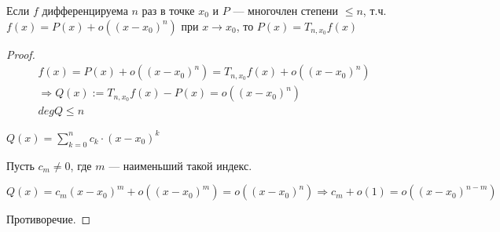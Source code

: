 \begin{follow}
    Если $f$ дифференцируема $n$ раз в точке $x_0$ и $P$ --- многочлен степени $\leqslant n$, т.ч.
    $f(x) = P(x) + o((x - x_0)^n)$ при $x \rightarrow x_0$, то $P(x) = T_{n,x_0} f(x)$

    \begin{proof}
        
        \begin{gather*}
            f(x) = P(x) + o((x - x_0)^n) = T_{n,x_0} f(x) + o((x - x_0)^n)  \\
            \Longrightarrow Q(x) := T_{n, x_0} f(x) - P(x) = o((x - x_0)^n) \\
            deg Q \leqslant n
        \end{gather*}

        $Q(x) = \sum_{k = 0}^{n} c_k \cdot (x - x_0)^k $
        
        Пусть $c_m \neq 0$, где $m$ --- наименьший такой индекс.

        $Q(x) = c_m(x - x_0)^m + o((x - x_0)^m) = o((x - x_0)^n) \Longrightarrow c_m + o(1) = o((x - x_0)^{n - m})$

        Противоречие.

    \end{proof}
\end{follow}